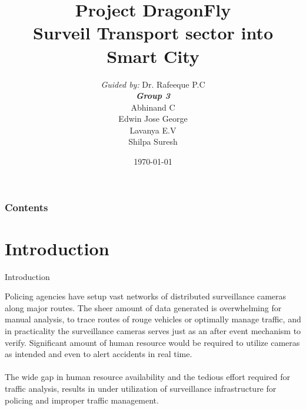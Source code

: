 \documentclass{beamer}
\title[DragonFly]{Project DragonFly \\ Surveil Transport sector into Smart City}
\author[Group 3]{
	{\small \textit{Guided by:}} Dr. Rafeeque P.C \\
	\medskip
	{\small \textbf{\textit{Group 3}}} \\
	Abhinand C \\
	Edwin Jose George \\
	Lavanya E.V \\
	Shilpa Suresh
}
\institute[GCEK]{Government College of Engineering Kannur}
\date{\today}
\begin{document}
\begin{frame}
\titlepage
\end{frame}

\begin{frame}
\frametitle{Contents}
\tableofcontents
\end{frame}


\section{Introduction}
\begin{frame}{Introduction}
	
    Policing agencies have setup vast networks of distributed surveillance cameras along major routes. The sheer amount of data generated is overwhelming for manual analysis, to trace routes of rouge vehicles or optimally manage traffic, and in practicality the surveillance cameras serves just as an after event mechanism to verify. Significant amount of human resource would be required to utilize cameras as intended and even to alert accidents in real time. \\~\\

    The wide gap in human resource availability and the tedious effort required for traffic analysis, results in under utilization of surveillance infrastructure for policing and improper traffic management.
    
    
\end{frame}

\end{document}
